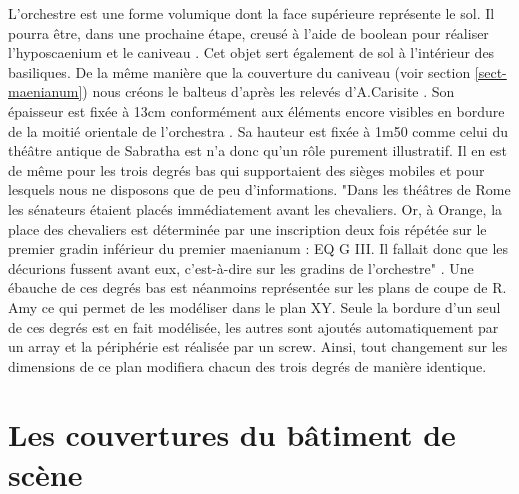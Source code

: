L'orchestre est une forme volumique dont la face supérieure représente le sol. Il pourra être, dans une prochaine étape, creusé à l'aide de \gls{boolean} pour réaliser l'\gls{hyposcaenium} et le caniveau \cite[Chap. VI]{orangeTxt}. Cet objet sert également de sol à l'intérieur des \glspl{basilique}. De la même manière que la couverture du caniveau (voir section \ref{sect-maenianum}) nous créons le \gls{balteus} d'après les relevés d'A.Carisite \cite[Pl. I]{orangePl}. Son épaisseur est fixée à 13cm conformément aux éléments encore visibles en bordure de la moitié orientale de l'\gls{orchestra} \cite[p. 340]{orangeTxt}. Sa hauteur est fixée à 1m50 comme celui du théâtre antique de Sabratha \cite[p. 96]{lachaux} est n'a donc qu'un rôle purement illustratif. Il en est de même pour les trois degrés bas qui supportaient des sièges mobiles et pour lesquels nous ne disposons que de peu d'informations. "Dans les théâtres de Rome les sénateurs étaient placés immédiatement avant les chevaliers. Or, à Orange, la place des chevaliers est déterminée par une inscription deux fois répétée sur le premier gradin inférieur du premier \gls{maenianum} : EQ G III. Il fallait donc que les décurions fussent avant eux, c'est-à-dire sur les gradins de l'orchestre" \cite[p.46]{formige}. Une ébauche de ces degrés bas est néanmoins représentée sur les plans de coupe de R. Amy \cite[PL. XVI]{orangePl} ce qui permet de les modéliser dans le plan XY. Seule la bordure d'un seul de ces degrés est en fait modélisée, les autres sont ajoutés automatiquement par un \gls{array} et la périphérie est réalisée par un \gls{screw}. Ainsi, tout changement sur les dimensions de ce plan modifiera chacun des trois degrés de manière identique.

\section{Les couvertures du bâtiment de scène}
\label{sect-couverture}

